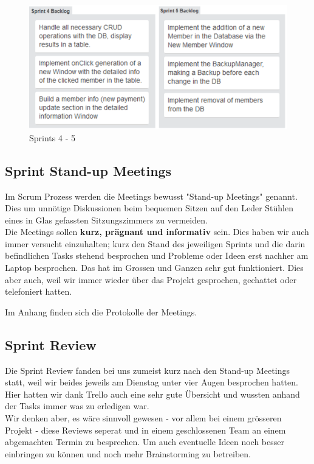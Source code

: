 \documentclass{article}
\begin{document}
\begin{figure}[h]
	\centering
	\includegraphics[width=0.4\paperwidth]{Sprint4-5}
	\caption{Sprints 4 - 5}
\end{figure}

\subsection{Sprint Stand-up Meetings}
Im Scrum Prozess werden die Meetings bewusst "Stand-up Meetings" genannt. Dies um unnötige Diskussionen  beim bequemen Sitzen auf den Leder Stühlen eines in Glas gefassten Sitzungszimmers zu vermeiden.\\
Die Meetings sollen \textbf{kurz, prägnant und informativ} sein.
Dies haben wir auch immer versucht einzuhalten; kurz den Stand des jeweiligen Sprints und die darin befindlichen Tasks stehend besprochen und Probleme oder Ideen erst nachher am Laptop besprochen.
Das hat im Grossen und Ganzen sehr gut funktioniert. Dies aber auch, weil wir immer wieder über das Projekt gesprochen, gechattet oder telefoniert hatten.

Im Anhang finden sich die Protokolle der Meetings.

\subsection{Sprint Review}
Die Sprint Review fanden bei uns zumeist kurz nach den Stand-up Meetings statt, weil wir beides jeweils am Dienstag unter vier Augen besprochen hatten.
Hier hatten wir dank Trello auch eine sehr gute Übersicht und wussten anhand der Tasks immer was zu erledigen war.\\
Wir denken aber, es wäre sinnvoll gewesen - vor allem bei einem grösseren Projekt - diese Reviews seperat und in einem geschlossenen Team an einem abgemachten Termin zu besprechen. Um auch eventuelle Ideen noch besser einbringen zu können und noch mehr Brainstorming zu betreiben.
\end{document}

